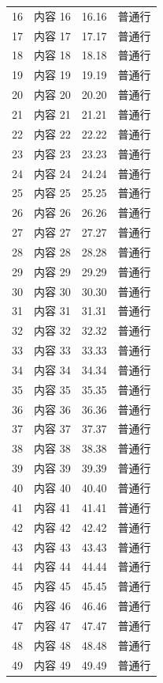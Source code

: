 {\begin{longtable}{!{\vrule width 1pt}c|c|r|p{25mm}!{\vrule width 1pt}}
    16 & 内容 16 & 16.16 & 普通行 \\
    17 & 内容 17 & 17.17 & 普通行 \\
    18 & 内容 18 & 18.18 & 普通行 \\
    19 & 内容 19 & 19.19 & 普通行 \\
    20 & 内容 20 & 20.20 & 普通行 \\
    21 & 内容 21 & 21.21 & 普通行 \\
    22 & 内容 22 & 22.22 & 普通行 \\
    23 & 内容 23 & 23.23 & 普通行 \\
    24 & 内容 24 & 24.24 & 普通行 \\
    25 & 内容 25 & 25.25 & 普通行 \\
    26 & 内容 26 & 26.26 & 普通行 \\
    27 & 内容 27 & 27.27 & 普通行 \\
    28 & 内容 28 & 28.28 & 普通行 \\
    29 & 内容 29 & 29.29 & 普通行 \\
    30 & 内容 30 & 30.30 & 普通行 \\
    31 & 内容 31 & 31.31 & 普通行 \\
    32 & 内容 32 & 32.32 & 普通行 \\
    33 & 内容 33 & 33.33 & 普通行 \\
    34 & 内容 34 & 34.34 & 普通行 \\
    35 & 内容 35 & 35.35 & 普通行 \\
    36 & 内容 36 & 36.36 & 普通行 \\
    37 & 内容 37 & 37.37 & 普通行 \\
    38 & 内容 38 & 38.38 & 普通行 \\
    39 & 内容 39 & 39.39 & 普通行 \\
    40 & 内容 40 & 40.40 & 普通行 \\
    41 & 内容 41 & 41.41 & 普通行 \\
    42 & 内容 42 & 42.42 & 普通行 \\
    43 & 内容 43 & 43.43 & 普通行 \\
    44 & 内容 44 & 44.44 & 普通行 \\
    45 & 内容 45 & 45.45 & 普通行 \\
    46 & 内容 46 & 46.46 & 普通行 \\
    47 & 内容 47 & 47.47 & 普通行 \\
    48 & 内容 48 & 48.48 & 普通行 \\
    49 & 内容 49 & 49.49 & 普通行 \\

\end{longtable}}
